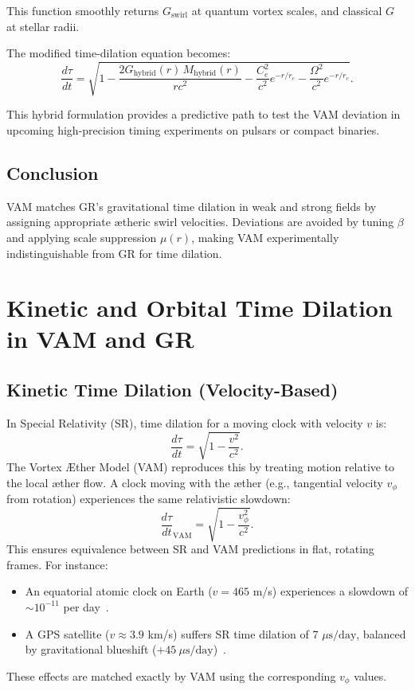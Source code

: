 \documentclass[a4paper, aps,preprint,superscriptaddress, 12pt]{revtex4}
\begin{document}
This function smoothly returns $G_{\text{swirl}}$ at quantum vortex scales, and classical $G$ at stellar radii.

The modified time-dilation equation becomes:
\begin{equation}
    \frac{d\tau}{dt} = \sqrt{1 - \frac{2 G_{\text{hybrid}}(r) \, M_{\text{hybrid}}(r)}{r c^2} - \frac{C_e^2}{c^2} e^{-r/r_c} - \frac{\Omega^2}{c^2} e^{-r/r_c}}.
    \label{eq:hybrid_time_dilation}
\end{equation}

This hybrid formulation provides a predictive path to test the VAM deviation in upcoming high-precision timing experiments on pulsars or compact binaries.


\subsection*{Conclusion}
VAM matches GR's gravitational time dilation in weak and strong fields by assigning appropriate ætheric swirl velocities. Deviations are avoided by tuning $\beta$ and applying scale suppression $\mu(r)$, making VAM experimentally indistinguishable from GR for time dilation.
\section{Kinetic and Orbital Time Dilation in VAM and GR}

\subsection{Kinetic Time Dilation (Velocity-Based)}

In Special Relativity (SR), time dilation for a moving clock with velocity $v$ is:
\[
    \frac{d\tau}{dt} = \sqrt{1 - \frac{v^2}{c^2}}.
\]
The Vortex Æther Model (VAM) reproduces this by treating motion relative to the local æther flow. A clock moving with the æther (e.g., tangential velocity $v_\phi$ from rotation) experiences the same relativistic slowdown:
\[
    \frac{d\tau}{dt}_\text{VAM} = \sqrt{1 - \frac{v_\phi^2}{c^2}}.
\]
This ensures equivalence between SR and VAM predictions in flat, rotating frames. For instance:
\begin{itemize}
    \item An equatorial atomic clock on Earth ($v=465$ m/s) experiences a slowdown of $\sim 10^{-11}$ per day~\cite{ashby2003relativity}.
    \item A GPS satellite ($v \approx 3.9$ km/s) suffers SR time dilation of 7 $\mu\text{s}/\text{day}$, balanced by gravitational blueshift ($+45~\mu\text{s}/\text{day}$)~\cite{ashby2003relativity}.
\end{itemize}
These effects are matched exactly by VAM using the corresponding $v_\phi$ values.
\end{document}
